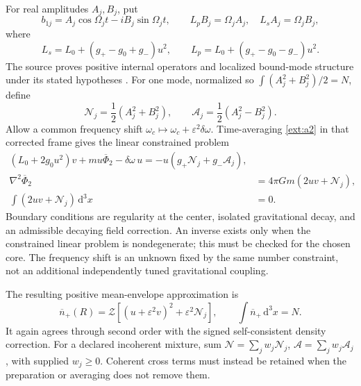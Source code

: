 \documentclass[11pt]{article}
\newcommand{\dd}{\mathrm d}
\newcommand{\lap}{\nabla^2}
\newcommand{\avg}[1]{\overline{#1}}
\newcommand{\Ncal}{\mathcal N}
\newcommand{\Acal}{\mathcal A}
\begin{document}
For real amplitudes $A_j,B_j$, put
\begin{equation}
 b_{1j}=A_j\cos\Omega_jt-iB_j\sin\Omega_jt,
 \qquad L_pB_j=\Omega_jA_j,\quad L_sA_j=\Omega_jB_j,
\end{equation}
where
\begin{equation}
 L_s=L_0+(g_+-g_0+g_-)u^2,\qquad
 L_p=L_0+(g_+-g_0-g_-)u^2.
\end{equation}
The source proves positive internal operators and localized bound-mode structure under its stated hypotheses \cite[Theorem 4.3]{channelmain}. For one mode, normalized so $\int(A_j^2+B_j^2)/2=N$, define
\begin{equation}
 \Ncal_j=\frac12(A_j^2+B_j^2),\qquad
 \Acal_j=\frac12(A_j^2-B_j^2).
\end{equation}
Allow a common frequency shift $\omega_c\mapsto\omega_c+\varepsilon^2\delta\omega$. Time-averaging \eqref{ext:a2} in that corrected frame gives the linear constrained problem
\begin{align}
 \boxed{(L_0+2g_0u^2)v+mu\avg\Phi_2-\delta\omega\,u
             =-u(g_+\Ncal_j+g_-\Acal_j),}\label{ext:meanbvp}\\
 \lap\avg\Phi_2&=4\pi Gm(2uv+\Ncal_j),\\
 \int(2uv+\Ncal_j)\,\dd^3x&=0.\label{ext:meannumber}
\end{align}
Boundary conditions are regularity at the center, isolated gravitational decay, and an admissible decaying field correction. An inverse exists only when the constrained linear problem is nondegenerate; this must be checked for the chosen core. The frequency shift is an unknown fixed by the same number constraint, not an additional independently tuned gravitational coupling.

The resulting positive mean-envelope approximation is
\begin{equation}
 \boxed{\avg n_+(R)=\mathcal Z
       [(u+\varepsilon^2v)^2+\varepsilon^2\Ncal_j],\qquad
       \int\avg n_+\,\dd^3x=N.}\label{ext:meanpositive}
\end{equation}
It again agrees through second order with the signed self-consistent density correction. For a declared incoherent mixture, sum $\Ncal=\sum_jw_j\Ncal_j$, $\Acal=\sum_jw_j\Acal_j$, with supplied $w_j\ge0$. Coherent cross terms must instead be retained when the preparation or averaging does not remove them.
\end{document}
